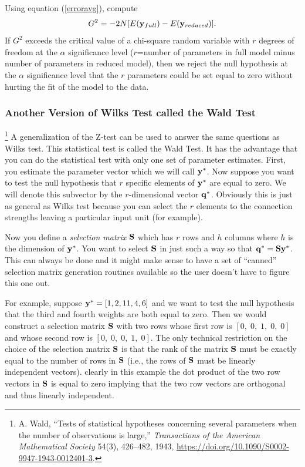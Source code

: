 \documentclass{report}
\begin{document}
Using equation (\ref{erroravg}), compute
\begin{equation}
G^2 = -2N [E({\bf y}_{full}) - E({\bf y}_{reduced})].
\end{equation}
If $G^2$ exceeds the critical value of a chi-square random variable
with $r$ degrees of freedom at the $\alpha$ significance level
($r$=number of parameters in full model minus number of parameters in
reduced model), then we reject the null hypothesis at the $\alpha$
significance level that the $r$ parameters could be set equal to zero
without hurting the fit of the model to the data.

\subsubsection{Another Version of Wilks Test called the Wald Test}
\footnote{A. Wald, ``Tests of statistical hypotheses concerning several
parameters when the number of observations is large,'' \emph{Transactions of
the American Mathematical Society} 54(3), 426--482, 1943,
\url{https://doi.org/10.1090/S0002-9947-1943-0012401-3}.}
A generalization of the Z-test can be used to answer the same
questions as Wilks test. This statistical test is called the Wald
Test. It has the advantage that you can do the statistical test with
only one set of parameter estimates. First, you estimate the parameter
vector which we will call ${\bf y}^*$. Now suppose you want to test
the null hypothesis that $r$ specific elements of ${\bf y}^*$ are
equal to zero.  We will denote this subvector by the $r$-dimensional
vector ${\bf q}^*$. Obviously this is just as general as Wilks test
because you can select the $r$ elements to the connection strengths
leaving a particular input unit (for example).

Now you define a {\em selection matrix} ${\bf S}$ which has $r$ rows
and $h$ columns where $h$ is the dimension of ${\bf y}^*$. You want to
select ${\bf S}$ in just such a way so that ${\bf q}^* = {\bf S} {\bf
y}^*$. This can always be done and it might make sense to have a set
of ``canned'' selection matrix generation routines available so the
user doesn't have to figure this one out.

For example, suppose ${\bf y}^* = [1, 2, 11, 4, 6]$ and we want to
test the null hypothesis that the third and fourth weights are both
equal to zero. Then we would construct a selection matrix ${\bf S}$
with two rows whose first row is $[0,\; 0,\;1, \; 0, \; 0]$ and whose
second row is $[0, \; 0, \; 0, \; 1, \; 0]$. The only technical
restriction on the choice of the selection matrix ${\bf S}$ is that
the rank of the matrix ${\bf S}$ must be exactly equal to the number
of rows in ${\bf S}$ (i.e., the rows of ${\bf S}$ must be linearly
independent vectors).  clearly in this example the dot product of the
two row vectors in ${\bf S}$ is equal to zero implying that the two
row vectors are orthogonal and thus linearly independent.
\end{document}
